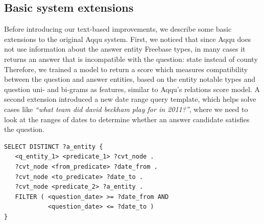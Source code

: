 \subsection{Basic system extensions}
\label{sec:baseline:extensions}
Before introducing our text-based improvements, we describe some basic extensions to the original Aqqu system.
First, we noticed that since Aqqu does not use information about the answer entity Freebase types, in many cases it returns an answer that is incompatible with the question: \eg state instead of county \etc
Therefore, we trained a model to return a score which measures compatibility between the question and answer entities, based on the entity notable types and question uni- and bi-grams as features, similar to Aqqu's relations score model.
A second extension introduced a new date range query template, which helps solve cases like \textit{``what team did david beckham play for in 2011?''}, where we need to look at the ranges of dates to determine whether an answer candidate satisfies the question.

\begin{lstlisting}[frame=single,basicstyle=\small]
SELECT DISTINCT ?a_entity {
   <q_entity_1> <predicate_1> ?cvt_node .
   ?cvt_node <from_predicate> ?date_from .
   ?cvt_node <to_predicate> ?date_to .
   ?cvt_node <predicate_2> ?a_entity .
   FILTER ( <question_date> >= ?date_from AND
            <question_date> <= ?date_to )
}
\end{lstlisting}

